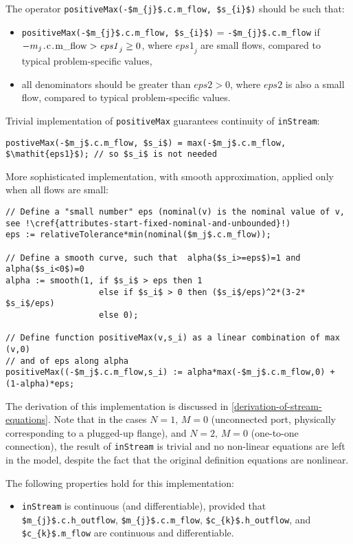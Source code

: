 \begin{nonnormative}
The operator \lstinline!positiveMax(-$m_{j}$.c.m_flow, $s_{i}$)! should be such that:
\begin{itemize}
\item
  \lstinline!positiveMax(-$m_{j}$.c.m_flow, $s_{i}$)! = \lstinline!-$m_{j}$.c.m_flow! if $-m_{j}\text{\lstinline!.c.m_flow!} > \mathit{eps1}_{j} \geq 0$, where $\mathit{eps1}_{j}$ are small flows, compared to typical problem-specific values,
\item
  all denominators should be greater than $\mathit{eps2} > 0$, where $\mathit{eps2}$ is also a small flow, compared to typical problem-specific values.
\end{itemize}

Trivial implementation of \lstinline!positiveMax! guarantees continuity of \lstinline!inStream!:
\begin{lstlisting}[language=modelica]
postiveMax(-$m_j$.c.m_flow, $s_i$) = max(-$m_j$.c.m_flow, $\mathit{eps1}$); // so $s_i$ is not needed
\end{lstlisting}
More sophisticated implementation, with smooth approximation, applied only when {all} flows are small:
\begin{lstlisting}[language=modelica,escapechar=!]
// Define a "small number" eps (nominal(v) is the nominal value of v, see !\cref{attributes-start-fixed-nominal-and-unbounded}!)
eps := relativeTolerance*min(nominal($m_j$.c.m_flow));

// Define a smooth curve, such that  alpha($s_i>=eps$)=1 and alpha($s_i<0$)=0
alpha := smooth(1, if $s_i$ > eps then 1
                   else if $s_i$ > 0 then ($s_i$/eps)^2*(3-2* $s_i$/eps)
                   else 0);

// Define function positiveMax(v,s_i) as a linear combination of max (v,0)
// and of eps along alpha
positiveMax((-$m_j$.c.m_flow,s_i) := alpha*max(-$m_j$.c.m_flow,0) + (1-alpha)*eps;
\end{lstlisting}

The derivation of this implementation is discussed in \cref{derivation-of-stream-equations}.
Note that in the cases $N = 1,\, M = 0$ (unconnected port, physically corresponding to a plugged-up flange), and $N = 2,\,  M = 0$ (one-to-one connection), the result of \lstinline!inStream! is trivial and no non-linear equations are left in the model, despite the fact that the original definition equations are nonlinear.

The following properties hold for this implementation:
\begin{itemize}
\item
  \lstinline!inStream! is continuous (and differentiable), provided that \lstinline!$m_{j}$.c.h_outflow!, \lstinline!$m_{j}$.c.m_flow!, \lstinline!$c_{k}$.h_outflow!, and \lstinline!$c_{k}$.m_flow! are continuous and differentiable.
\end{itemize}


\end{nonnormative}
